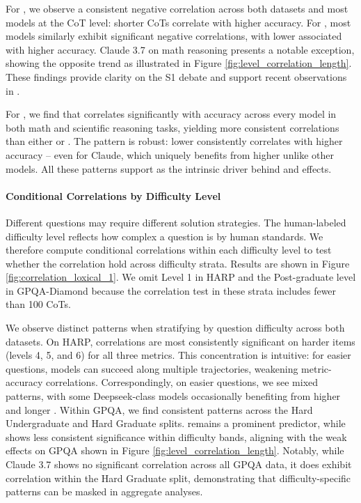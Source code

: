 For \Length, we observe a consistent negative correlation across both datasets and most models at the CoT level: shorter CoTs correlate with higher accuracy. For \rr, most models similarly exhibit significant negative correlations, with lower \rr associated with higher accuracy. Claude 3.7 on math reasoning presents a notable exception, showing the opposite trend as illustrated in Figure \ref{fig:level_correlation_length}. These findings provide clarity on the S1 debate and support recent observations in \citep{wu2025more, hassid2025don}.

For \failedstep, we find that \fsf correlates significantly with accuracy across every model in both math and scientific reasoning tasks, yielding more consistent correlations than either \Length or \rr. The pattern is robust: lower \fsf consistently correlates with higher accuracy -- even for Claude, which uniquely benefits from higher \rr unlike other models. All these patterns support \fsf as the intrinsic driver behind \Length and \rr effects. 

\paragraph{Conditional Correlations by Difficulty Level} Different questions may require different solution strategies. The human-labeled difficulty level reflects how complex a question is by human standards. We therefore compute conditional correlations within each difficulty level to test whether the correlation hold across difficulty strata. Results are shown in Figure \ref{fig:correlation_loxical_1}. We omit Level 1 in HARP and the Post-graduate level in GPQA-Diamond because the correlation test in these strata includes fewer than 100 CoTs. 

We observe distinct patterns when stratifying by question difficulty across both datasets. On HARP, correlations are most consistently significant on harder items (levels 4, 5, and 6) for all three metrics. This concentration is intuitive: for easier questions, models can succeed along multiple trajectories, weakening metric-accuracy correlations. Correspondingly, on easier questions, we see mixed patterns, with some Deepseek-class models occasionally benefiting from higher \rr and longer \Length. Within GPQA, we find consistent patterns across the Hard Undergraduate and Hard Graduate splits. \Length remains a prominent predictor, while \rr shows less consistent significance within difficulty bands, aligning with the weak \rr effects on GPQA shown in Figure \ref{fig:level_correlation_length}. Notably, while Claude 3.7 shows no significant correlation across all GPQA data, it does exhibit correlation within the Hard Graduate split, demonstrating that difficulty-specific patterns can be masked in aggregate analyses.

